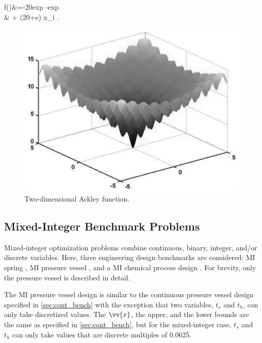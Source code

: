 \documentclass{article}                                                                           %
\newenvironment{myalign}{\par\nobreak\small\noindent\align}{\endalign}
\begin{document}
\begin{myalign} \label{eq:Ackley}
  f()&=-20exp \left[-0.2 \sqrt{\frac{1}{d} \Sigma_{i=1}^d x_i^2} \right]-exp \left[\frac{1}{d} \Sigma_{i=1}^d cos(2\pi x_i) \right] \nonumber \\
  & + (20+e) \hspace{2.5cm} x_i \in [-32.768,32.768]. \nonumber
\end{myalign}
     
\begin{figure}[!t]
  \centering
  \includegraphics[width=4.5in]{Ackley}
  \caption{Two-dimensional Ackley function.}
  \label{fig:Ackley}
\end{figure}

\subsection{Mixed-Integer Benchmark Problems} \label{sec:mi_bench}
Mixed-integer optimization problems combine continuous, binary, integer, and/or discrete variables.
Here, three engineering design benchmarks are considered: MI spring \cite{Lampinen1999}, MI pressure vessel \cite{Cagnina2008}, and a MI chemical process design \cite{Yiqing2007}.
For brevity, only the pressure vessel is described in detail.

The MI pressure vessel design is similar to the continuous pressure vessel design specified in \autoref{sec:cont_bench} with the exception that two variables, $t_s$ and $t_h$, can only take discretized values.
The $\vv{x}$, the upper, and the lower bounds are the same as specified in \autoref{sec:cont_bench}, but for the mixed-integer case, $t_s$ and $t_h$ can only take values that are discrete multiples of 0.0625.
\end{document}
